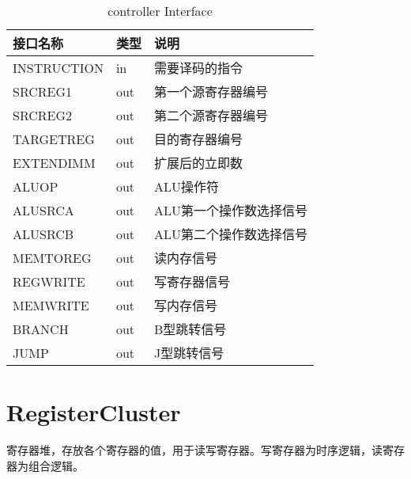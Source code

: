 \begin{table}[H]
\begin{center}
\renewcommand{\arraystretch}{1.3}
\small
\caption{controller Interface}
\label{tab:treatments}
\begin{tabular}{|p{3cm}<{\centering}|p{1.4cm}<{\centering}|p{7cm}<{\centering}|}
\hline
接口名称 & 类型 & 说明 \\
\hline
INSTRUCTION & in & 需要译码的指令 \\
\hline
SRCREG1 & out & 第一个源寄存器编号 \\
\hline
SRCREG2 & out & 第二个源寄存器编号\\
\hline
TARGETREG & out & 目的寄存器编号 \\
\hline
EXTENDIMM & out & 扩展后的立即数 \\
\hline
ALUOP & out & ALU操作符 \\
\hline
ALUSRCA & out & ALU第一个操作数选择信号 \\
\hline
ALUSRCB & out & ALU第二个操作数选择信号 \\
\hline
MEMTOREG & out &  读内存信号 \\
\hline
REGWRITE & out & 写寄存器信号 \\
\hline
MEMWRITE & out & 写内存信号 \\
\hline
BRANCH & out & B型跳转信号 \\
\hline
JUMP & out & J型跳转信号 \\
\hline
\end{tabular}
\end{center}
\end{table}


\section{RegisterCluster}

寄存器堆，存放各个寄存器的值，用于读写寄存器。写寄存器为时序逻辑，读寄存器为组合逻辑。

